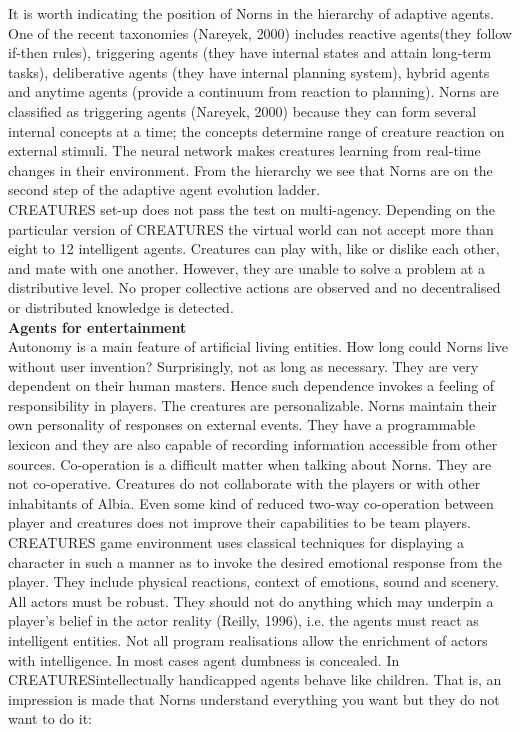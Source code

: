 \documentclass[11pt,twoside,a4paper]{article}
\begin{document}
It is worth indicating the position of Norns in the hierarchy of adaptive agents. One of the recent taxonomies (Nareyek, 2000) includes reactive agents(they follow if-then rules), triggering agents (they have internal states and attain long-term tasks), deliberative agents (they have internal planning system), hybrid agents and anytime agents (provide a continuum from reaction to planning). Norns are classified as triggering agents (Nareyek, 2000) because they can form several internal concepts at a time; the concepts determine range of creature reaction on external stimuli. The neural network makes creatures learning from real-time changes in their environment. From the hierarchy we see that Norns are on the second step of the adaptive agent evolution ladder.~\\

CREATURES set-up does not pass the test on multi-agency. Depending on the particular version of CREATURES the virtual world can not accept more than eight to 12 intelligent agents. Creatures can play with, like or dislike each other, and mate with one another. However, they are unable to solve a problem at a distributive level. No proper collective actions are observed and no decentralised or distributed knowledge is detected.~\\

\textbf{Agents for entertainment}~\\

Autonomy is a main feature of artificial living entities. How long could Norns live without user invention? Surprisingly, not as long as necessary. They are very dependent on their human masters. Hence such dependence invokes a feeling of responsibility in players. The creatures are personalizable. Norns maintain their own personality of responses on external events. They have a programmable lexicon and they are also capable of recording information accessible from other sources. Co-operation is a difficult matter when talking about Norns. They are not co-operative. Creatures do not collaborate with the players or with other inhabitants of Albia. Even some kind of reduced two-way co-operation between player and creatures does not improve their capabilities to be team players.~\\

CREATURES game environment uses classical techniques for displaying a character in such a manner as to invoke the desired emotional response from the player. They include physical reactions, context of emotions, sound and scenery. All actors must be robust. They should not do anything which may underpin a player's belief in the actor reality (Reilly, 1996), i.e. the agents must react as intelligent entities. Not all program realisations allow the enrichment of actors with intelligence. In most cases agent dumbness is concealed. In CREATURESintellectually handicapped agents behave like children. That is, an impression is made that Norns understand everything you want but they do not want to do it:~\\
\end{document}
